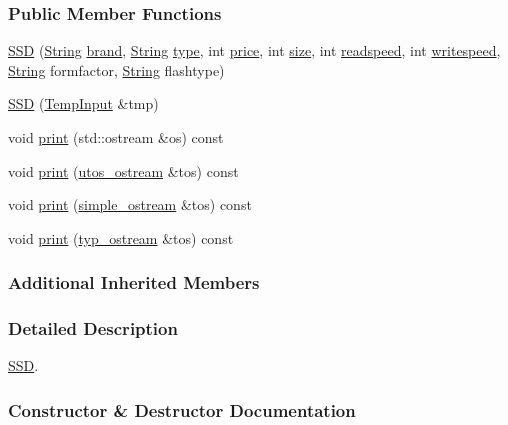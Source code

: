\subsubsection*{Public Member Functions}
\begin{DoxyCompactItemize}
\item 
\mbox{\hyperlink{class_s_s_d_a1e80104276b02f8ca6f016f41a2a5f41}{S\+SD}} (\mbox{\hyperlink{class_string}{String}} \mbox{\hyperlink{class_part_ae06f2fdeb7fbbdb229a7aca151f3e341}{brand}}, \mbox{\hyperlink{class_string}{String}} \mbox{\hyperlink{class_part_a101dbcc5c4b21564df7414c7eb0eae88}{type}}, int \mbox{\hyperlink{class_part_a8e71223aed1da95a974f33d8d6c91bb1}{price}}, int \mbox{\hyperlink{class_storage_abcc80ce58a21fa884035617ee0b6cb67}{size}}, int \mbox{\hyperlink{class_storage_a41073842ff16961dad3903e6dd49bb0c}{readspeed}}, int \mbox{\hyperlink{class_storage_a0198a1483ccf849d48c76da88599ba8b}{writespeed}}, \mbox{\hyperlink{class_string}{String}} formfactor, \mbox{\hyperlink{class_string}{String}} flashtype)
\item 
\mbox{\hyperlink{class_s_s_d_a21d101c62d384539899d6af07baa4a83}{S\+SD}} (\mbox{\hyperlink{struct_temp_input}{Temp\+Input}} \&tmp)
\item 
void \mbox{\hyperlink{class_s_s_d_a3c07aa0fd7bb547cfb4a775513e427a9}{print}} (std\+::ostream \&os) const
\item 
void \mbox{\hyperlink{class_s_s_d_ab07086e302f8be99cfa757583d2017a0}{print}} (\mbox{\hyperlink{structutos__ostream}{utos\+\_\+ostream}} \&tos) const
\item 
void \mbox{\hyperlink{class_s_s_d_a7efed56d8590399c61d8eefca9295c91}{print}} (\mbox{\hyperlink{structsimple__ostream}{simple\+\_\+ostream}} \&tos) const
\item 
void \mbox{\hyperlink{class_s_s_d_a6e252152f8ba75043edec67e19d686e0}{print}} (\mbox{\hyperlink{structtyp__ostream}{typ\+\_\+ostream}} \&tos) const
\end{DoxyCompactItemize}
\subsubsection*{Additional Inherited Members}


\subsubsection{Detailed Description}
\mbox{\hyperlink{class_s_s_d}{S\+SD}}. 

\subsubsection{Constructor \& Destructor Documentation}
\mbox{\label{class_s_s_d_a1e80104276b02f8ca6f016f41a2a5f41}} 
